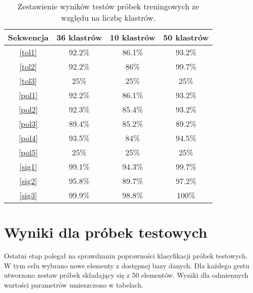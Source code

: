 \begin{table} [h!]
	\centering
	\begin{tabular}{|c|c|c|c|}
		\hline
		\textbf{Sekwencja} 	& \textbf{36 klastrów} & \textbf{10 klastrów} & \textbf{50 klastrów} \\ \hline
		\ref{tol1} 	& 92.2\% 		& 86.1\%	& 93.2\% \\ \hline
		\ref{tol2} 	& 92.2\% 		& 86\%		& 99.7\% \\ \hline
		\ref{tol3}	& 25\%			& 25\%		& 25\%	 \\ \hline \hline
		\ref{pol1} 	& 92.2\% 		& 86.1\%	& 93.2\% \\ \hline
		\ref{pol2} 	& 92.3\% 		& 85.4\%	& 93.2\% \\ \hline
		\ref{pol3}	& 89.4\%		& 85.2\%	& 89.2\%	 \\ \hline
		\ref{pol4}	& 93.5\%		& 84\%		& 94.5\%	 \\ \hline
		\ref{pol5}	& 25\%			& 25\%		& 25\%	 \\ \hline \hline
		\ref{sig1}	& 99.1\% 		& 94.3\%	& 99.7\% \\ \hline
		\ref{sig2}	& 95.8\% 		& 89.7\%	& 97.2\% \\ \hline
		\ref{sig3}	& 99.9\%		& 98.8\%	& 100\%	 \\ \hline
	\end{tabular}
	\caption{Zestawienie wyników testów próbek treningowych ze względu na liczbę klastrów.}
	\label{tab: train}
\end{table}

\section{Wyniki dla próbek testowych}
Ostatni etap polegał na sprawdzaniu poprawności klasyfikacji próbek testowych. W tym celu wybrano nowe elementy z dostępnej bazy danych. Dla każdego gestu utworzono zestaw próbek składający się z 50 elementów. Wyniki dla odmiennych wartości parametrów umieszczono w tabelach. 

